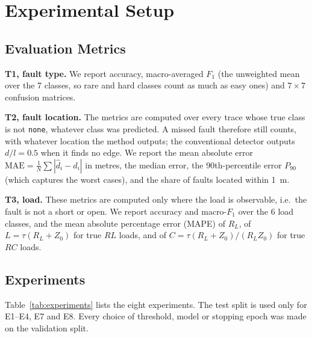 \section{Experimental Setup}
\label{sec:experiments}

\subsection{Evaluation Metrics}
\textbf{T1, fault type.} We report accuracy, macro-averaged $F_1$ (the unweighted mean over the 7 classes, so rare and hard classes count as much as easy ones) and $7\times7$ confusion matrices.

\textbf{T2, fault location.} The metrics are computed over every trace whose true class is not \texttt{none}, whatever class was predicted. A missed fault therefore still counts, with whatever location the method outputs; the conventional detector outputs $d/l = 0.5$ when it finds no edge. We report the mean absolute error $\mathrm{MAE} = \frac{1}{N}\sum |\hat d_i - d_i|$ in metres, the median error, the 90th-percentile error $P_{90}$ (which captures the worst cases), and the share of faults located within 1~m.

\textbf{T3, load.} These metrics are computed only where the load is observable, i.e.\ the fault is not a short or open. We report accuracy and macro-$F_1$ over the 6 load classes, and the mean absolute percentage error (MAPE) of $R_L$, of $L = \tau (R_L + Z_0)$ for true $RL$ loads, and of $C = \tau (R_L + Z_0)/(R_L Z_0)$ for true $RC$ loads.

\subsection{Experiments}
Table~\ref{tab:experiments} lists the eight experiments. The test split is used only for E1--E4, E7 and E8. Every choice of threshold, model or stopping epoch was made on the validation split.

